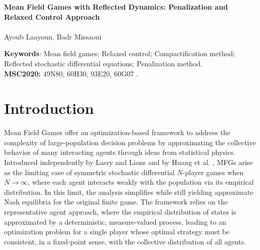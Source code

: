 \documentclass[11pt,amsfonts]{article}
\theoremstyle{plain}
\theoremstyle{assumpstyle}
\numberwithin{equation}{section}
\numberwithin{theorem}{section}
\numberwithin{proposition}{section}
\numberwithin{definition}{section}
\numberwithin{remark}{section}
\numberwithin{corollary}{section}
\numberwithin{lemma}{section}
\begin{document}
 
	\sloppy
	
	\begin{center}
        {\Large \textbf{Mean Field Games with Reflected Dynamics: Penalization and Relaxed Control Approach}} \\[0pt]
		~\\[0pt]  Ayoub Laayoun, Badr Missaoui 
        \renewcommand{\thefootnote}{}

        	\renewcommand{\thefootnote}{\arabic{footnote}}

	\end{center}
	
	\renewcommand{\thefootnote}{\arabic{footnote}}
\begin{abstract}
In this paper, we investigate a class of Mean Field Games (MFGs) in which the state dynamics are governed by multidimensional reflected stochastic differential equations (SDEs). We establish the existence of an equilibrium and show that it can be approximated by the equilibrium of MFGs with non-reflected SDE. This approximation is constructed via a penalization method combined with the relaxed control approach introduced in \cite{laker}. Under a uniform ellipticity condition, and by applying the penalization method together with the mimicking theorem, we prove the existence of a Markovian MFG. Furthermore, under an additional convexity assumption, we demonstrate the existence of a strict-Markovian MFG. In the general case, we prove that relaxed MFG solutions with reflected dynamics can be approximated by strict controls whose dynamics are governed by penalized SDEs.
\end{abstract}
{\bf Keywords}: Mean field games; Relaxed control; Compactification method; Reflected stochastic differential equations; Penalization method. \\
\textbf{MSC2020:} 49N80, 60H30, 93E20, 60G07 .
\section{Introduction}
Mean Field Games offer an optimization-based framework to address the complexity of large-population decision problems by approximating the collective behavior of many interacting agents through ideas from statistical physics. Introduced independently by Lasry and Lions \cite{LasryP, lasry2, lasry3} and by Huang et al. \cite{malhame1, malhame2}, MFGs arise as the limiting case of symmetric stochastic differential $N$-player games when $N \to \infty$, where each agent interacts weakly with the population via its empirical distribution. In this limit, the analysis simplifies while still yielding approximate Nash equilibria for the original finite game. The framework relies on the representative agent approach, where the empirical distribution of states is approximated by a deterministic, measure-valued process, leading to an optimization problem for a single player whose optimal strategy must be consistent, in a fixed-point sense, with the collective distribution of all agents.
\end{document}
